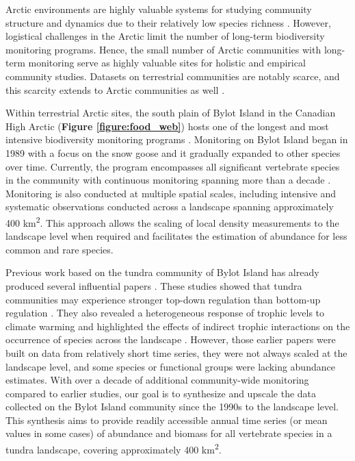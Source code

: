 \documentclass[a4paper,twoside,12pt]{article}
\begin{document}
Arctic environments are highly valuable systems for studying community structure and dynamics due to their relatively low species richness \citep{payer2013, legagneux2014}. However, logistical challenges in the Arctic limit the number of long-term biodiversity monitoring programs. Hence, the small number of Arctic communities with long-term monitoring serve as highly valuable sites for holistic and empirical community studies. Datasets on terrestrial communities are notably scarce, and this scarcity extends to Arctic communities as well \citep{ims2013}.

Within terrestrial Arctic sites, the south plain of Bylot Island in the Canadian High Arctic (\textbf{Figure \ref{figure:food_web}}) hosts one of the longest and most intensive biodiversity monitoring programs \citep{gauthier2024a}. Monitoring on Bylot Island began in 1989 with a focus on the snow goose and it gradually expanded to other species over time. Currently, the program encompasses all significant vertebrate species in the community with continuous monitoring spanning more than a decade \citep{gauthier2024a}. Monitoring is also conducted at multiple spatial scales, including intensive and systematic observations conducted across a landscape spanning approximately 400 km\textsuperscript{2}. This approach allows the scaling of local density measurements to the landscape level when required and facilitates the estimation of abundance for less common and rare species.

Previous work based on the tundra community of Bylot Island  has already produced several influential papers \citep{gauthier2011, legagneux2012, legagneux2014,hutchison2020, duchesne2021, gauthier2024b}. These studies showed that tundra communities may experience stronger top-down regulation than bottom-up regulation \citep{legagneux2012, legagneux2014}. They also revealed a heterogeneous response of trophic levels to climate warming \citep{gauthier2013} and highlighted the effects of indirect trophic interactions on the occurrence of species across the landscape \citep{duchesne2021}. However, those earlier papers were built on data from relatively short time series, they were not always scaled at the landscape level, and some species or functional groups were lacking abundance estimates. With over a decade of additional community-wide monitoring compared to earlier studies, our goal is to synthesize and upscale the data collected on the Bylot Island community since the 1990s to the landscape level. This synthesis aims to provide readily accessible annual time series (or mean values in some cases) of abundance and biomass for all vertebrate species in a tundra landscape, covering approximately 400 km\textsuperscript{2}. 
\end{document}
